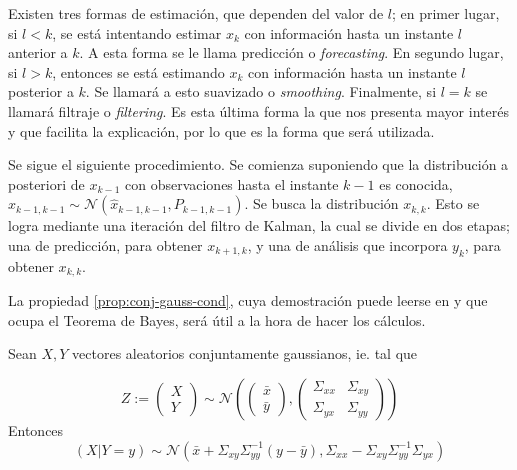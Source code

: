 Existen tres formas de estimación, que dependen del valor de \(l\); en primer lugar, si \(l < k\), se está intentando estimar \(x_k\) con información hasta un instante \(l\) anterior a \(k\). A esta forma se le llama predicción o \textit{forecasting}. En segundo lugar, si \(l>k\), entonces se está estimando \(x_k\) con información hasta un instante \(l\) posterior a \(k\). Se llamará a esto suavizado o \textit{smoothing}. Finalmente, si \(l = k\) se llamará filtraje o \textit{filtering}. Es esta última forma la que nos presenta mayor interés y que facilita la explicación, por lo que es la forma que será utilizada.

Se sigue el siguiente procedimiento. Se comienza suponiendo que la distribución a posteriori de \(x_{k-1}\) con observaciones hasta el instante \(k-1\) es conocida, \(x_{k-1, k-1} \sim \mathcal{N}(\hat{x}_{k-1, k-1}, P_{k-1, k-1})\). Se busca la distribución \(x_{k, k}\). Esto se logra mediante una iteración del filtro de Kalman, la cual se divide en dos etapas; una de predicción, para obtener \(x_{k+1, k}\), y una de análisis que incorpora \(y_k\), para obtener \(x_{k, k}\).

La propiedad \ref{prop:conj-gauss-cond}, cuya demostración puede leerse en \cite{Anderson2005} y que ocupa el Teorema de Bayes, será útil a la hora de hacer los cálculos.


\begin{prop}
\label{prop:conj-gauss-cond}
Sean \(X, Y\) vectores aleatorios conjuntamente
gaussianos, ie. tal que

\[
Z := \begin{pmatrix}
X\\
Y
\end{pmatrix} \sim \mathcal{N}\left(
\begin{pmatrix}
\bar{x} \\
\bar{y}
\end{pmatrix}, 
\begin{pmatrix}
\Sigma_{xx} & \Sigma_{xy} \\
\Sigma_{yx} & \Sigma_{yy}
\end{pmatrix}
\right)
\] Entonces \[
(X|Y=y) \sim \mathcal{N} \left( \bar{x} + \Sigma_{xy}\Sigma_{yy}^{-1}(y-\bar{y}),
\Sigma_{xx} - \Sigma_{xy}\Sigma_{yy}^{-1}\Sigma_{yx}
 \right)
\]
\end{prop}



